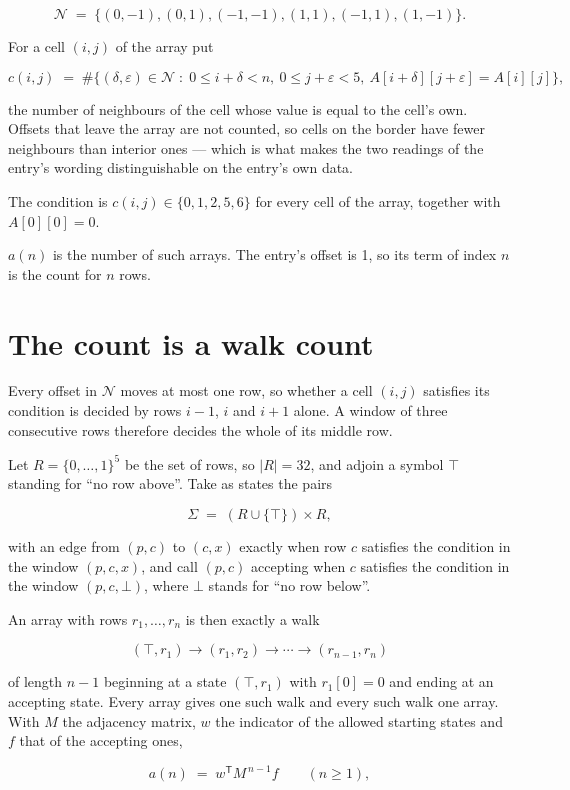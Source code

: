 \documentclass[11pt]{article}
\theoremstyle{definition}
\begin{document}
\[\mathcal{N} \;=\; \{(0,-1), (0,1), (-1,-1), (1,1), (-1,1), (1,-1)\}.\]

For a cell $(i,j)$ of the array put

\[c(i,j) \;=\; \#\bigl\{(\delta,\varepsilon)\in\mathcal{N} \;:\; 0\le i+\delta<n,\ 0\le j+\varepsilon<5,\ A[i+\delta][j+\varepsilon] = A[i][j]\bigr\},\]

the number of neighbours of the cell whose value is equal to the cell's own. Offsets that leave the array are not counted, so cells on the border have fewer neighbours than interior ones --- which is what makes the two readings of the entry's wording distinguishable on the entry's own data.

The condition is $c(i,j) \in \{0, 1, 2, 5, 6\}$ for every cell of the array, together with $A[0][0]=0$.

$a(n)$ is the number of such arrays. The entry's offset is 1, so its term of index $n$ is the count for $n$ rows.

\section{The count is a walk count}

Every offset in $\mathcal{N}$ moves at most one row, so whether a cell $(i,j)$ satisfies its condition is decided by rows $i-1$, $i$ and $i+1$ alone. A window of three consecutive rows therefore decides the whole of its middle row.

Let $R = \{0,\dots,1\}^{5}$ be the set of rows, so $|R| = 32$, and adjoin a symbol $\top$ standing for ``no row above''. Take as states the pairs

\[\Sigma \;=\; (R \cup \{\top\}) \times R,\]

with an edge from $(p,c)$ to $(c,x)$ exactly when row $c$ satisfies the condition in the window $(p,c,x)$, and call $(p,c)$ accepting when $c$ satisfies the condition in the window $(p,c,\bot)$, where $\bot$ stands for ``no row below''.

An array with rows $r_1,\dots,r_n$ is then exactly a walk

\[(\top,r_1) \to (r_1,r_2) \to \cdots \to (r_{n-1},r_n)\]

of length $n-1$ beginning at a state $(\top,r_1)$ with $r_1[0]=0$ and ending at an accepting state. Every array gives one such walk and every such walk one array. With $M$ the adjacency matrix, $w$ the indicator of the allowed starting states and $f$ that of the accepting ones,

\[a(n) \;=\; w^{\mathsf T} M^{\,n-1} f \qquad (n \ge 1),\]
\end{document}
